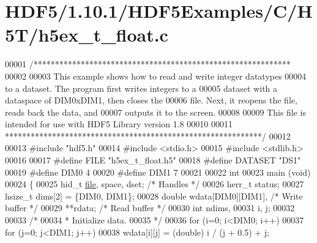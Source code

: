 \hypertarget{_h_d_f5_21_810_81_2_h_d_f5_examples_2_c_2_h5_t_2h5ex__t__float_8c_source}{}\section{H\+D\+F5/1.10.1/\+H\+D\+F5\+Examples/\+C/\+H5\+T/h5ex\+\_\+t\+\_\+float.c}
\label{_h_d_f5_21_810_81_2_h_d_f5_examples_2_c_2_h5_t_2h5ex__t__float_8c_source}

\begin{DoxyCode}
00001 \textcolor{comment}{/************************************************************}
00002 \textcolor{comment}{}
00003 \textcolor{comment}{  This example shows how to read and write integer datatypes}
00004 \textcolor{comment}{  to a dataset.  The program first writes integers to a}
00005 \textcolor{comment}{  dataset with a dataspace of DIM0xDIM1, then closes the}
00006 \textcolor{comment}{  file.  Next, it reopens the file, reads back the data, and}
00007 \textcolor{comment}{  outputs it to the screen.}
00008 \textcolor{comment}{}
00009 \textcolor{comment}{  This file is intended for use with HDF5 Library version 1.8}
00010 \textcolor{comment}{}
00011 \textcolor{comment}{ ************************************************************/}
00012 
00013 \textcolor{preprocessor}{#include "hdf5.h"}
00014 \textcolor{preprocessor}{#include <stdio.h>}
00015 \textcolor{preprocessor}{#include <stdlib.h>}
00016 
00017 \textcolor{preprocessor}{#define FILE            "h5ex\_t\_float.h5"}
00018 \textcolor{preprocessor}{#define DATASET         "DS1"}
00019 \textcolor{preprocessor}{#define DIM0            4}
00020 \textcolor{preprocessor}{#define DIM1            7}
00021 
00022 \textcolor{keywordtype}{int}
00023 main (\textcolor{keywordtype}{void})
00024 \{
00025     hid\_t       \hyperlink{structfile}{file}, space, dset;          \textcolor{comment}{/* Handles */}
00026     herr\_t      status;
00027     hsize\_t     dims[2] = \{DIM0, DIM1\};
00028     \textcolor{keywordtype}{double}      wdata[DIM0][DIM1],          \textcolor{comment}{/* Write buffer */}
00029                 **rdata;                    \textcolor{comment}{/* Read buffer */}
00030     \textcolor{keywordtype}{int}         ndims,
00031                 i, j;
00032 
00033     \textcolor{comment}{/*}
00034 \textcolor{comment}{     * Initialize data.}
00035 \textcolor{comment}{     */}
00036     \textcolor{keywordflow}{for} (i=0; i<DIM0; i++)
00037         \textcolor{keywordflow}{for} (j=0; j<DIM1; j++)
00038             wdata[i][j] = (\textcolor{keywordtype}{double}) i / (j + 0.5) + j;

\end{DoxyCode}
